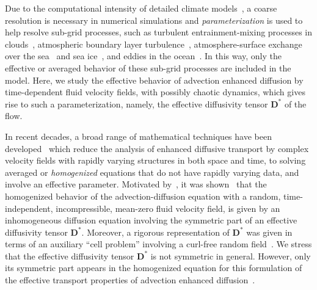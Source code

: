 \documentclass[leqno,onefignum,onetabnum]{siamltex1213}
\newcommand{\Db}{\mathbf{D}}
\begin{document}
Due to the computational intensity of detailed climate
models~\cite{Griffies:2003:10.1007,Washington:1986:9780935702521,Neelin:2010:CCCM},
a coarse resolution is necessary in numerical simulations and
\emph{parameterization} is used to help resolve sub-grid
processes, such as turbulent 
entrainment-mixing processes in clouds~\cite{Lu:JGR:D50094},
atmospheric boundary layer turbulence~\cite{Bretherton:JOC:5655449},
atmosphere-surface exchange over the
sea~\cite{Fairall:1996:JGRC6562} and sea
ice~\cite{Sorensen:TC:2014,Andreas:2010:QJ618,Andreas:JH:2010}, and
eddies in the ocean~\cite{McDougall:2001:book,Gent:JPO:1995}. In this
way, only the effective or averaged behavior of these sub-grid
processes are included in the model. Here, we study the effective
behavior of advection enhanced diffusion by time-dependent fluid
velocity fields, with possibly chaotic dynamics, which gives rise to
such a parameterization, namely, the effective diffusivity tensor
$\Db^*$ of the flow. 



In recent decades, a broad range of mathematical techniques have been
developed~\cite{McLaughlin:SIAM_JAM:780,Bensoussan:Book:1978,Biferale:PF:2725,Fannjiang:SIAM_JAM:333,Mauri:1991:3:743,Pavliotis:PHD_Thesis,Pavliotis:CMS:2007:507,Clark:1998:364,Holmes:1995:94481954,Hornung:1997:9780387947860,Majda:Kramer:1999:book,Majda:1994:10.1088}
which reduce the analysis of enhanced diffusive transport by complex
velocity fields with rapidly varying structures in both space and time, to
solving averaged or \emph{homogenized} equations that do not have
rapidly varying data, and involve an effective parameter. Motivated
by~\cite{Papanicolaou:RF-835}, it was
shown~\cite{McLaughlin:SIAM_JAM:780} that the homogenized behavior of
the advection-diffusion equation with a random, time-independent,
incompressible, mean-zero fluid velocity field, is given by an inhomogeneous
diffusion equation involving the symmetric part of an effective
diffusivity tensor $\Db^*$. Moreover, a rigorous representation of
$\Db^*$ was given in terms of an auxiliary ``cell problem'' involving
a curl-free random field~\cite{McLaughlin:SIAM_JAM:780}. We stress
that the effective diffusivity tensor $\Db^*$ is not symmetric in
general. However, only its symmetric part appears in the homogenized
equation for this formulation of the effective transport properties of
advection enhanced diffusion~\cite{McLaughlin:SIAM_JAM:780}.   
\end{document}
